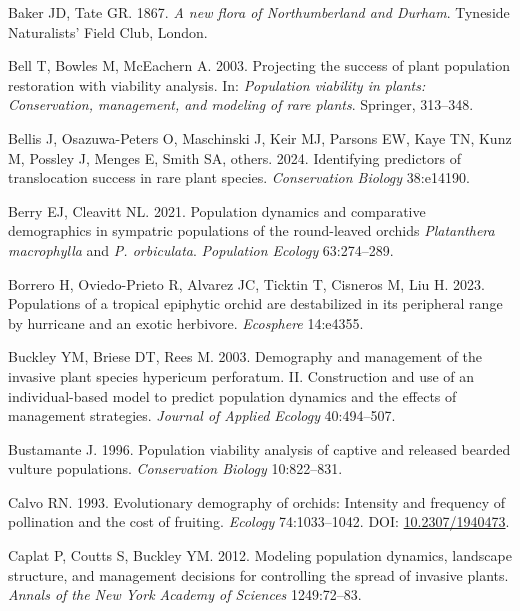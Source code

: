 \documentclass[
  12pt,
  letterpaper,
]{book}
\newlength{\cslhangindent}
\newenvironment{CSLReferences}[2] %
 {\begin{list}{}{%
  \setlength{\itemindent}{0pt}
  \setlength{\leftmargin}{0pt}
  \setlength{\parsep}{0pt}
  \ifodd #1
   \setlength{\leftmargin}{\cslhangindent}
   \setlength{\itemindent}{-1\cslhangindent}
  \fi
  \setlength{\itemsep}{#2\baselineskip}}}
 {\end{list}}
\begin{document}
\begin{CSLReferences}{1}{0}
Baker JD, Tate GR. 1867. \emph{A new flora of {N}orthumberland and
{D}urham}. Tyneside Naturalists' Field Club, London.

Bell T, Bowles M, McEachern A. 2003. Projecting the success of plant
population restoration with viability analysis. In: \emph{Population
viability in plants: Conservation, management, and modeling of rare
plants}. Springer, 313--348.

Bellis J, Osazuwa-Peters O, Maschinski J, Keir MJ, Parsons EW, Kaye TN,
Kunz M, Possley J, Menges E, Smith SA, others. 2024. Identifying
predictors of translocation success in rare plant species.
\emph{Conservation Biology} 38:e14190.

Berry EJ, Cleavitt NL. 2021. Population dynamics and comparative
demographics in sympatric populations of the round-leaved orchids
\emph{{P}latanthera {m}acrophylla} and \emph{{P}. {o}rbiculata}.
\emph{Population Ecology} 63:274--289.

Borrero H, Oviedo-Prieto R, Alvarez JC, Ticktin T, Cisneros M, Liu H.
2023. Populations of a tropical epiphytic orchid are destabilized in its
peripheral range by hurricane and an exotic herbivore. \emph{Ecosphere}
14:e4355.

Buckley YM, Briese DT, Rees M. 2003. Demography and management of the
invasive plant species hypericum perforatum. II. Construction and use of
an individual-based model to predict population dynamics and the effects
of management strategies. \emph{Journal of Applied Ecology} 40:494--507.

Bustamante J. 1996. Population viability analysis of captive and
released bearded vulture populations. \emph{Conservation Biology}
10:822--831.

Calvo RN. 1993. Evolutionary demography of orchids: Intensity and
frequency of pollination and the cost of fruiting. \emph{Ecology}
74:1033--1042. DOI:
\href{https://doi.org/10.2307/1940473}{10.2307/1940473}.

Caplat P, Coutts S, Buckley YM. 2012. Modeling population dynamics,
landscape structure, and management decisions for controlling the spread
of invasive plants. \emph{Annals of the New York Academy of Sciences}
1249:72--83.


\end{CSLReferences}
\end{document}
